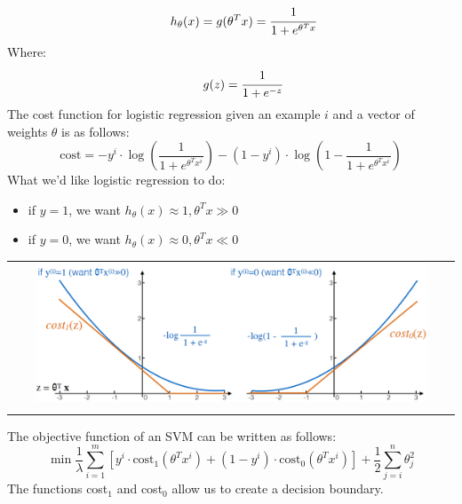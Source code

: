 \begin{equation} \tag*{}
    h_\theta(x) = g(\theta^Tx) = \cfrac{1}{1+e^{\theta^Tx}}
\end{equation}
Where:
\begin{equation} \tag*{}
    g(z) = \cfrac{1}{1+e^{-z}}
\end{equation}
The cost function for logistic regression given an example $i$ and a vector of weights $\theta$ is as follows:
\begin{equation} \tag*{}
    \text{cost} = -y^i \cdot \log(\frac{1}{1+e^{\theta^Tx^i}}) - (1-y^i) \cdot \log(1-\frac{1}{1+e^{\theta^Tx^i}})
\end{equation}
What we'd like logistic regression to do:
\begin{itemize}
    \item if $y = 1$, we want $h_\theta(x) \approx 1, \theta^Tx \gg 0$
    \item if $y = 0$, we want $h_\theta(x) \approx 0, \theta^Tx \ll 0$
\end{itemize}
\begin{center}
    \begin{tabular}{c}
        \\ \includegraphics[width=0.9\textwidth]{images/SVM1.png} \\ \\
    \end{tabular}
\end{center}
The objective function of an SVM can be written as follows:
\begin{equation} \tag*{}
    \min \frac{1}{\lambda} \sum^m_{i=1} [y^i \cdot \text{cost}_1(\theta^Tx^i) + (1 - y^i) \cdot \text{cost}_0(\theta^Tx^i)] + \frac{1}{2} \sum^n_{j=i}\theta^2_j
\end{equation}
The functions cost$_1$ and cost$_0$ allow us to create a decision boundary.

\newpage
